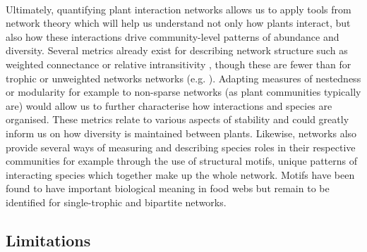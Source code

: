 \documentclass[a4,12pt]{article}
\begin{document}
        \paragraph{}
        Ultimately, quantifying plant interaction networks allows us to apply tools from network theory which will help us understand not only how plants interact, but also how these interactions drive community-level patterns of abundance and diversity. Several metrics already exist for describing network structure such as weighted connectance \parencite{Ulanowicz1991} or relative intransitivity \parencite{Laird2006a}, though these are fewer than for trophic or unweighted networks networks (e.g. \cite{Bersier2002, Delmas2019}). Adapting measures of nestedness or modularity for example to non-sparse networks (as plant communities typically are) would allow us to further characterise how interactions and species are organised. These metrics relate to various aspects of stability and could greatly inform us on how diversity is maintained between plants. Likewise, networks also provide several ways of measuring and describing species roles in their respective communities \parencite{Cirtwill2018a} for example through the use of structural motifs, unique patterns of interacting species which together make up the whole network. Motifs have been found to have important biological meaning in food webs \parencite{Bascompte2005a} but remain to be identified for single-trophic and bipartite networks. 

     


   \subsection{Limitations}
\end{document}
